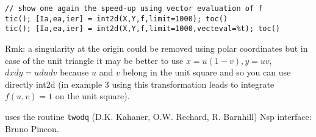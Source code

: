 \begin{examples}
\begin{Verbatim}
// show one again the speed-up using vector evaluation of f
tic(); [Ia,ea,ier] = int2d(X,Y,f,limit=1000); toc()
tic(); [Ia,ea,ier] = int2d(X,Y,f,limit=1000,vecteval=%t); toc()
\end{Verbatim}
Rmk: a singularity at the origin could be removed using polar
coordinates but in case of the unit triangle it may be better
to use $x = u(1-v), y = uv$, $dxdy = u dudv$ because $u$ and $v$
belong in the unit square and so you can use directly int2d
(in example 3 using this transformation leads to integrate $f(u,v)=1$
on the unit square). 
\end{examples}

\begin{manseealso}
\end{manseealso}

\begin{authors}
  uses the routine \verb!twodq! (D.K. Kahaner, O.W. Rechard, R. Barnhill)
  Nsp interface: Bruno Pincon.
\end{authors}
